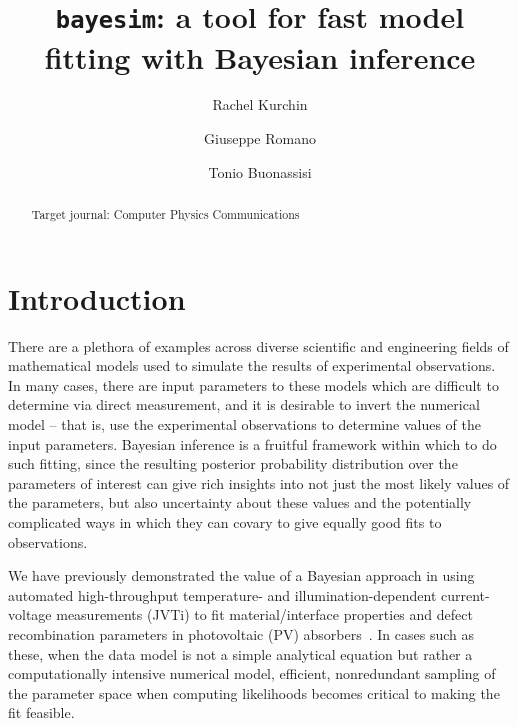 \documentclass[aps,prl,amsmath,amssymb,superscriptaddress,notitlepage,groupedaddress]{revtex4-1}
\begin{document}
\title{\texttt{bayesim}: a tool for fast model fitting with Bayesian inference}
\author{Rachel Kurchin}
\author{Giuseppe Romano}
\author{Tonio Buonassisi}

\begin{abstract}
Target journal: Computer Physics Communications
\end{abstract}

\maketitle

\section*{Introduction}
  There are a plethora of examples across diverse scientific and engineering fields of mathematical models used to simulate the results of experimental observations. In many cases, there are input parameters to these models which are difficult to determine via direct measurement, and it is desirable to invert the numerical model -- that is, use the experimental observations to determine values of the input parameters. Bayesian inference is a fruitful framework within which to do such fitting, since the resulting posterior probability distribution over the parameters of interest can give rich insights into not just the most likely values of the parameters, but also uncertainty about these values and the potentially complicated ways in which they can covary to give equally good fits to observations.

  We have previously demonstrated the value of a Bayesian approach in using automated high-throughput temperature- and illumination-dependent current-voltage measurements (JVTi) to fit material/interface properties and defect recombination parameters in photovoltaic (PV) absorbers~\cite{SnSJoule,FeBayes}. In cases such as these, when the data model is not a simple analytical equation but rather a computationally intensive numerical model, efficient, nonredundant sampling of the parameter space when computing likelihoods becomes critical to making the fit feasible.
\end{document}
